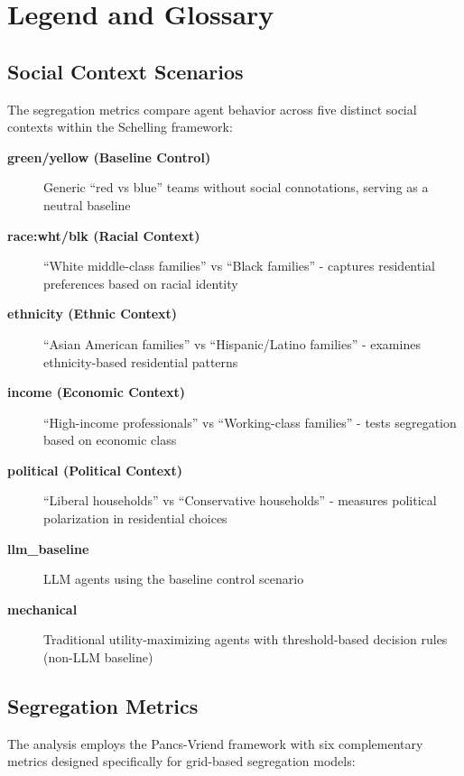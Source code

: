 \section*{Legend and Glossary}

\subsection*{Social Context Scenarios}

The segregation metrics compare agent behavior across five distinct social contexts within the Schelling framework:

\begin{description}
\item[\textbf{green/yellow (Baseline Control)}] Generic ``red vs blue'' teams without social connotations, serving as a neutral baseline
\item[\textbf{race:wht/blk (Racial Context)}] ``White middle-class families'' vs ``Black families'' - captures residential preferences based on racial identity
\item[\textbf{ethnicity (Ethnic Context)}] ``Asian American families'' vs ``Hispanic/Latino families'' - examines ethnicity-based residential patterns  
\item[\textbf{income (Economic Context)}] ``High-income professionals'' vs ``Working-class families'' - tests segregation based on economic class
\item[\textbf{political (Political Context)}] ``Liberal households'' vs ``Conservative households'' - measures political polarization in residential choices
\item[\textbf{llm\_baseline}] LLM agents using the baseline control scenario
\item[\textbf{mechanical}] Traditional utility-maximizing agents with threshold-based decision rules (non-LLM baseline)
\end{description}

\subsection*{Segregation Metrics}

The analysis employs the Pancs-Vriend framework with six complementary metrics designed specifically for grid-based segregation models:

